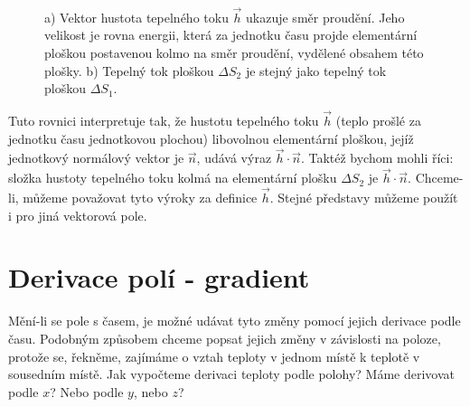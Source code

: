     \begin{figure}[ht!]
      \centering
       \\                                          
      \caption{a) Vektor hustota tepelného toku $\vec{h}$ ukazuje směr proudění. Jeho velikost
                je rovna energii, která za jednotku času projde elementární ploškou postavenou 
                kolmo na směr proudění, vydělené obsahem této plošky. b) Tepelný tok ploškou 
                $\Delta S_2$ je stejný jako tepelný tok ploškou $\Delta S_1$.
                \cite[s.~30]{Feynman02}}
      \label{fyz:fig153}
    \end{figure}
    
    Tuto rovnici interpretuje tak, že hustotu tepelného toku $\vec{h}$ (teplo prošlé za jednotku 
    času jednotkovou plochou) libovolnou elementární ploškou, jejíž jednotkový normálový vektor 
    je $\vec{n}$, udává výraz $\vec{h}\cdot\vec{n}$. Taktéž bychom mohli říci: složka hustoty 
    tepelného toku kolmá na elementární plošku $\Delta S_2$ je $\vec{h}\cdot\vec{n}$. Chceme-li, 
    můžeme považovat tyto výro\-ky za definice $\vec{h}$. Stejné představy můžeme použít i pro 
    jiná vektorová pole.
        
  \section{Derivace polí - gradient}\label{fyz:IIchapIIsecIV}
    Mění-li se pole s časem, je možné udávat tyto změny pomocí jejich derivace podle času. Podobným 
    způsobem chceme popsat jejich změny v závislosti na poloze, protože se, řekněme, zajímáme o 
    vztah teploty v jednom místě k teplotě v sousedním místě. Jak vypočteme derivaci teploty podle 
    polohy? Máme derivovat podle $x$? Nebo podle $y$, nebo $z$?
  
